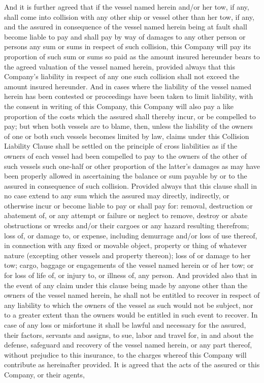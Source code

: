 \documentclass[10pt]{article}
\begin{document}
\begin{linenumbers}
And it is further agreed that if the vessel named herein and/or her tow, if any, shall come into collision with any other  ship  or  vessel  other  than  her  tow,  if  any,  and  the  assured  in  consequence  of  the  vessel  named  herein  being  at fault shall become liable to pay and shall pay by way of damages to any other person or persons any sum or sums in respect  of  such  collision,  this  Company  will  pay  its  proportion  of  such  sum  or  sums  so  paid  as  the  amount  insured hereunder  bears  to  the  agreed  valuation  of  the  vessel  named  herein,  provided  always  that  this  Company's  liability  in respect  of  any  one  such  collision  shall  not  exceed  the  amount  insured  hereunder.  And  in  cases  where  the  liability  of the vessel named herein has been contested or proceedings have been taken to limit liability, with the consent in writing of this Company, this Company will also pay a like proportion of the costs which the assured shall thereby incur, or be compelled to pay; but when both vessels are to blame, then, unless the liability of the owners of one or both such vessels  becomes  limited  by  law,  claims  under  this  Collision  Liability  Clause  shall  be  settled  on  the  principle of  cross liabilities as if the owners of each vessel had been compelled to pay to the owners of the other of such vessels such one-half  or  other  proportion  of  the  latter's  damages  as  may  have  been  properly  allowed  in  ascertaining  the  balance or  sum  payable  by  or  to  the  assured  in  consequence  of  such  collision.  Provided  always  that  this  clause  shall  in  no case  extend  to  any  sum  which  the  assured  may  directly,  indirectly,  or  otherwise  incur  or  become  liable  to  pay  or shall  pay  for:  removal,  destruction  or  abatement  of,  or  any  attempt  or  failure  or  neglect  to  remove,  destroy  or  abate obstructions  or  wrecks  and/or  their  cargoes  or  any  hazard  resulting  therefrom;  loss  of,  or  damage  to,  or  expense, including  demurrage  and/or  loss  of  use  thereof,  in  connection  with  any  fixed  or  movable  object,  property  or  thing of  whatever  nature	(excepting  other  vessels  and  property  thereon);  loss  of  or  damage  to  her  tow;  cargo,  baggage or  engagements  of  the  vessel  named  herein  or  of  her  tow;  or  for  loss  of  life  of,  or  injury  to,  or  illness  of, any person. And provided also that in the event of any claim under this clause being made by anyone other than the owners of the vessel named herein, he shall not be entitled to recover in respect of any liability to which the owners of the vessel as such would not be subject, nor to a greater extent than the owners would be entitled in such event to recover. In  case  of  any  loss  or  misfortune  it  shall  be  lawful  and  necessary  for  the  assured,  their  factors,  servants  and assigns,  to  sue,  labor  and  travel  for,  in  and  about  the  defense,  safeguard  and  recovery  of  the  vessel  named  herein, or  any  part  thereof, without prejudice to this insurance, to the charges whereof this Company will contribute as hereinafter provided.   It   is   agreed   that   the   acts   of   the   assured   or   this   Company,   or   their   agents,   
\end{linenumbers}
\end{document}
